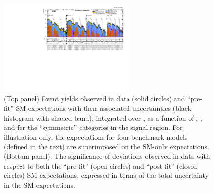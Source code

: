 \begin{figure}[!h]
  \begin{center}
    \includegraphics[angle=90,width=0.6\textwidth]{figures/result/summaryPlot_Symmetric_prefit_overlay_fit_b}
    \caption{(Top panel) Event yields observed in data (solid circles)
      and ``pre-fit'' SM expectations with their associated
      uncertainties (black histogram with shaded band), integrated
      over \HTmiss,  as a function
      of \njet, \nb, and \scalht for the ``symmetric'' \njet categories
      in the signal region. For illustration only, the  
      expectations for four benchmark models (defined in the text) are
      superimposed on the SM-only expectations. (Bottom panel). The
      significance of deviations observed in data with respect to both
      the ``pre-fit'' (open circles) and ``post-fit'' (closed circles)
      SM expectations, expressed in terms of the total uncertainty in
      the SM expectations. }
    \label{fig:sym}
  \end{center}
\end{figure}

%
%
%


